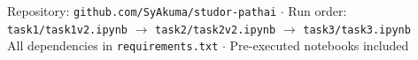 \documentclass[10pt,a4paper]{article}
\begin{document}
\vspace{8pt}
\begin{center}
\small\color{darkgray}
Repository: \texttt{github.com/SyAkuma/studor-pathai} $\cdot$
Run order: \texttt{task1/task1v2.ipynb} $\rightarrow$ \texttt{task2/task2v2.ipynb}
$\rightarrow$ \texttt{task3/task3.ipynb}\\
All dependencies in \texttt{requirements.txt} $\cdot$ Pre-executed notebooks included
\end{center}
\end{document}
